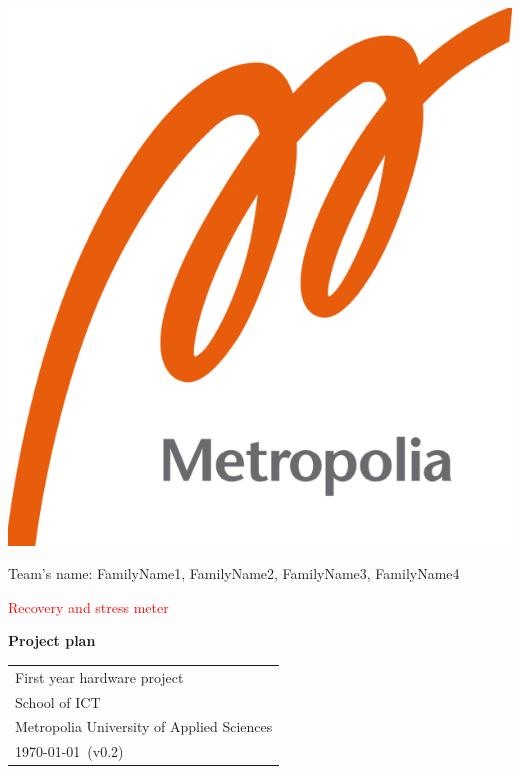 \documentclass{article}
\begin{document}
\begin{center}
\includegraphics[scale=0.2]{logo.png}
\end{center}

\vspace{0.5cm}

\begin{center}

 Team's name: FamilyName1, FamilyName2, FamilyName3, FamilyName4 \\

\vspace{0.5cm}

{\Huge \textcolor{red}{Recovery and stress meter}} \\


\vspace{0.5cm}

{\Large \textbf{Project plan}} \\


\end{center}

\vspace{1cm}

\begin{center}

{\Large }



\begin{tabular}{l}
 First year hardware project \\
 School of ICT\\
 Metropolia University of Applied Sciences  \\
 \today \, (v0.2)
\end{tabular}
\end{center}
\end{document}
